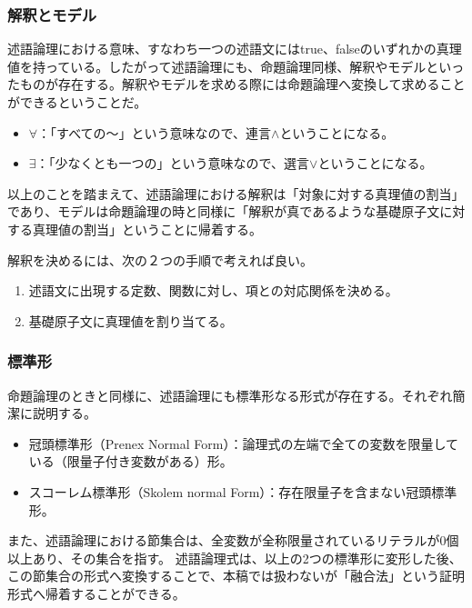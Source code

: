 \documentclass[dvipdfmx]{jsarticle}
\begin{document}
  \subsubsection{解釈とモデル}
述語論理における意味、すなわち一つの述語文にはtrue、falseのいずれかの真理値を持っている。したがって述語論理にも、命題論理同様、解釈やモデルといったものが存在する。解釈やモデルを求める際には命題論理へ変換して求めることができるということだ。
\begin{itemize}
  \item $\forall$：「すべての〜」という意味なので、連言$\wedge$ということになる。
  \item $\exists$：「少なくとも一つの」という意味なので、選言$\vee$ということになる。
\end{itemize}
以上のことを踏まえて、述語論理における解釈は「対象に対する真理値の割当」であり、モデルは命題論理の時と同様に「解釈が真であるような基礎原子文に対する真理値の割当」ということに帰着する。\par
解釈を決めるには、次の２つの手順で考えれば良い。
\begin{enumerate}
  \item 述語文に出現する定数、関数に対し、項との対応関係を決める。
  \item 基礎原子文に真理値を割り当てる。
\end{enumerate}
  \subsubsection{標準形}
命題論理のときと同様に、述語論理にも標準形なる形式が存在する。それぞれ簡潔に説明する。
\begin{itemize}
  \item 冠頭標準形（Prenex Normal Form）：論理式の左端で全ての変数を限量している（限量子付き変数がある）形。
  \item スコーレム標準形（Skolem normal Form）：存在限量子を含まない冠頭標準形。
\end{itemize}
また、述語論理における節集合は、全変数が全称限量されているリテラルが0個以上あり、その集合を指す。
述語論理式は、以上の2つの標準形に変形した後、この節集合の形式へ変換することで、本稿では扱わないが「融合法」という証明形式へ帰着することができる。
\end{document}
